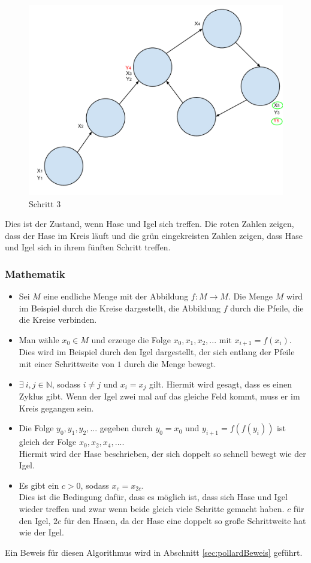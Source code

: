     \begin{figure}[!h] 
    	\centering
    	\includegraphics[width=0.7\linewidth]{Rho3}
    	\caption{Schritt 3}
    	\label{fig:Rho3)}
    \end{figure}
    Dies ist der Zustand, wenn Hase und Igel sich treffen. Die roten Zahlen zeigen, dass der Hase im Kreis l\"auft und die gr\"un eingekreisten Zahlen zeigen, dass Hase und Igel sich in ihrem f\"unften Schritt treffen. 

  \subsubsection{Mathematik}
  \begin{itemize}


  	\item Sei $M$ eine endliche Menge mit der Abbildung $f : M \rightarrow M$. Die Menge $M$ wird im Beispiel durch die Kreise dargestellt, die Abbildung $f$ durch die Pfeile, die die Kreise verbinden.\\
  	
  	\item Man w\"ahle $x_0 \in M$ und erzeuge die Folge $x_0, x_1, x_2,...$ mit $x_{i+1} = f(x_i)$. Dies wird im Beispiel durch den Igel dargestellt, der sich entlang der Pfeile mit einer Schrittweite von $1$ durch die Menge bewegt.
	
  	\item $\exists \ i,j \in \mathbb{N}$, sodass $i \not= j$ und $x_i = x_j$ gilt. Hiermit wird gesagt, dass es einen Zyklus gibt. Wenn der Igel zwei mal auf das gleiche Feld kommt, muss er im Kreis gegangen sein.
  	
  	\item Die Folge $y_0, y_1, y_2,...$ gegeben durch $y_0=x_0$ und $y_{i+1}=f(f(y_i))$ ist gleich der Folge $x_0,x_2,x_4,...$.\\
  Hiermit wird der Hase beschrieben, der sich doppelt so schnell bewegt wie der Igel. 
  	
  	\item Es gibt ein $c>0$, sodass $x_c=x_{2c}$.\\
  	Dies ist die Bedingung daf\"ur, dass es m\"oglich ist, dass sich Hase und Igel wieder treffen und zwar wenn beide gleich viele Schritte gemacht haben. $c$ f\"ur den Igel, $2c$ f\"ur den Hasen, da der Hase eine doppelt so große Schrittweite hat wie der Igel.
  \end{itemize}
  
  Ein Beweis f\"ur diesen Algorithmus wird in Abschnitt \ref{sec:pollardBeweis} gef\"uhrt.